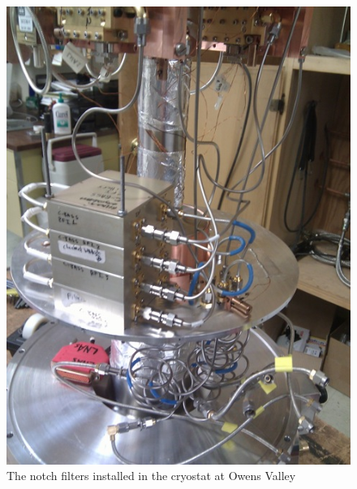 \begin{figure}
 \centering
 \includegraphics[height=0.6\textheight]{./images/NotchFilter/cryostatInstall.jpg}
 \caption{The notch filters installed in the cryostat at Owens Valley}
 \label{fig:cryostatInstall}
\end{figure}

